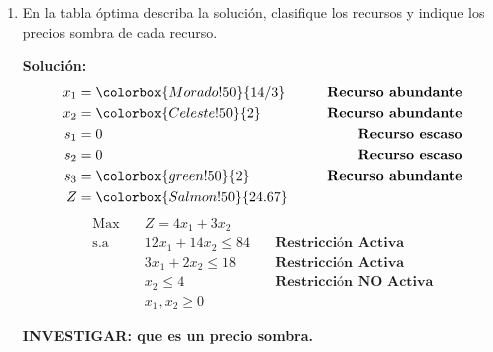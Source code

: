 \documentclass{templateNote}
\begin{document}
\begin{enumerate}
    \item En la tabla \'optima describa la soluci\'on, clasifique los recursos y indique los precios sombra de cada recurso.
    
    \textbf{Solución:}
    \begin{align*}
        x_1 &= \colorbox{Morado!50}{14/3} \qquad &\textbf{Recurso abundante} \\
        x_2 &= \colorbox{Celeste!50}{2} \qquad &\textbf{Recurso abundante} \\
        s_1 &= 0 \qquad &\textbf{Recurso escaso} \\
        s_2 &= 0 \qquad &\textbf{Recurso escaso} \\
        s_3 &= \colorbox{green!50}{2} \qquad &\textbf{Recurso abundante} \\
        Z &= \colorbox{Salmon!50}{24.67}
    \end{align*}
    \begin{equation*}
        \begin{aligned}
            \text{Max} \quad & Z = 4x_1 + 3x_2 \\
            \text{s.a} \quad & 12x_1 + 14x_2 \leq 84 \quad &\textbf{Restricci\'on Activa} \\
            & 3x_1 + 2x_2 \leq 18 \quad &\textbf{Restricci\'on Activa} \\
            & x_2 \leq 4 \quad &\textbf{Restricci\'on NO Activa} \\
            & x_1, x_2 \geq 0
        \end{aligned}
    \end{equation*}

    \textbf{INVESTIGAR: que es un precio sombra.}
\end{enumerate}
\end{document}
